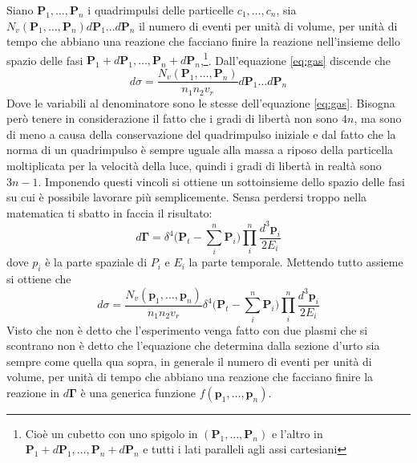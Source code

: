\documentclass[11pt,a4paper]{article}
\newcommand{\vettore}[1]{\mathbf{#1}}
\begin{document}
		Siano $\vettore P_1,\dots, \vettore P_n$ i quadrimpulsi delle particelle $c_1,\dots,c_n$, sia \\$N_v(\vettore P_1,\dots,\vettore P_n)d\vettore P_1\dots d\vettore P_n$ il numero di eventi per unità di volume, per unità di tempo che abbiano una reazione che facciano finire la reazione nell'insieme dello spazio delle fasi $\vettore P_1+d\vettore P_1,\dots,\vettore P_n +d\vettore P_n $,\footnote{Cioè un cubetto con uno spigolo in $(\vettore P_1,\dots,\vettore P_n)$ e l'altro in $\vettore P_1+d\vettore P_1,\dots,\vettore P_n +d\vettore P_n $ e tutti i lati paralleli agli assi cartesiani}.\newline
		Dall'equazione \ref{eq:gas} discende che 
		\begin{equation}
			d\sigma=\frac{N_v(\vettore P_1,\dots,\vettore P_n)}{n_1n_2v_r}d\vettore P_1\dots d\vettore P_n
		\end{equation}
		Dove le variabili al denominatore sono le stesse dell'equazione \ref{eq:gas}.\newline
		Bisogna però tenere in considerazione il fatto che i gradi di libertà non sono $4n$, ma sono di meno a causa della conservazione del quadrimpulso iniziale e dal fatto che la norma di un quadrimpulso è sempre uguale alla massa a riposo della particella moltiplicata per la velocità della luce, quindi i gradi di libertà in realtà sono $3n-1$.\newline
		Imponendo questi vincoli si ottiene un sottoinsieme dello spazio delle fasi su cui è possibile lavorare più semplicemente. Sensa perdersi troppo nella matematica ti sbatto in faccia il risultato:
		\begin{equation}
			d\vettore \Gamma=\delta^4\bigg(\vettore P_t-\sum_i^n \vettore P_i\bigg)\prod_i^n\frac{d^3\vettore p_i}{2E_i}
		\end{equation}
		dove $p_i$ è la parte spaziale di $P_i$ e $E_i$ la parte temporale.\newline
		Mettendo tutto assieme si ottiene che 
		\begin{equation}
			d\sigma=\frac{N_v(\vettore p_1,\dots,\vettore p_n)}{n_1n_2v_r}\delta^4\bigg(\vettore P_t-\sum_i^n \vettore P_i\bigg)\prod_i^n\frac{d^3\vettore p_i}{2E_i}
		\end{equation}
		Visto che non è detto che l'esperimento venga fatto con due plasmi che si scontrano non è detto che l'equazione che determina dalla sezione d'urto sia sempre come quella qua sopra, in generale il numero di eventi per unità di volume, per unità di tempo che abbiano una reazione che facciano finire la reazione in $d\vettore \Gamma$ è una generica funzione $f(\vettore p_1,\dots,\vettore p_n)$.\newline
\end{document}
